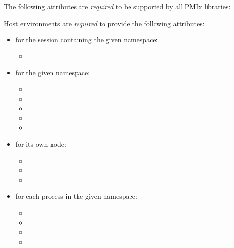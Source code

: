 \reqattrstart
The following attributes are \textit{required} to be supported by all \ac{PMIx} libraries:


\divider

Host environments are \textit{required} to provide the following attributes:

\begin{itemize}
    \item for the session containing the given namespace:
        \begin{itemize}
            \item {}
        \end{itemize}
    \item for the given namespace:
        \begin{itemize}
            \item {}
            \item {}
            \item {}
            \item {}
            \item {}
        \end{itemize}
    \item for its own node:
        \begin{itemize}
            \item {}
            \item {}
            \item {}
        \end{itemize}
    \item for each process in the given namespace:
        \begin{itemize}
            \item {}
            \item {}
            \item {}
            \item {}
        \end{itemize}
\end{itemize}

